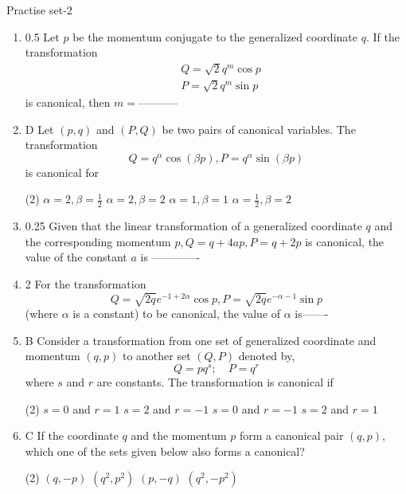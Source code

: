 \newpage
\begin{abox}
	Practise set-2
\end{abox}
\begin{enumerate}
	\item 0.5 Let $p$ be the momentum conjugate to the generalized coordinate $q$. If the transformation
	$$
	\begin{aligned}
	&Q=\sqrt{2} q^{m} \cos p \\
	&P=\sqrt{2} q^{m} \sin p
	\end{aligned}
	$$
	is canonical, then $m=$-----------
{}
	\item D Let $(p, q)$ and $(P, Q)$ be two pairs of canonical variables. The transformation
	$$
	Q=q^{\alpha} \cos (\beta p), P=q^{\alpha} \sin (\beta p)
	$$
	is canonical for
{}
	 \begin{tasks}(2)
		\task[\textbf{a.}]$\alpha=2, \beta=\frac{1}{2}$
		\task[\textbf{b.}]$\alpha=2, \beta=2$
		\task[\textbf{c.}]$\alpha=1, \beta=1$
		\task[\textbf{d.}] $\alpha=\frac{1}{2}, \beta=2$
	\end{tasks}
	\item 0.25 Given that the linear transformation of a generalized coordinate $q$ and the corresponding momentum $p, Q=q+4 a p, P=q+2 p$ is canonical, the value of the constant $a$ is -------------
	{}
\item 2 For the transformation
$$
Q=\sqrt{2 q} e^{-1+2 \alpha} \cos p, P=\sqrt{2 q} e^{-\alpha-1} \sin p
$$
(where $\alpha$ is a constant) to be canonical, the value of $\alpha$ is-------
{}
	\item B Consider a transformation from one set of generalized coordinate and momentum $(q, p)$ to another set $(Q, P)$ denoted by,
	$$
	Q=p q^{s} ; \quad P=q^{r}
	$$
	where $s$ and $r$ are constants. The transformation is canonical if
{}
	 \begin{tasks}(2)
		\task[\textbf{a.}]$s=0$ and $r=1$
		\task[\textbf{b.}]$s=2$ and $r=-1$
		\task[\textbf{c.}] $s=0$ and $r=-1$
		\task[\textbf{d.}] $s=2$ and $r=1$
	\end{tasks}
	\item C If the coordinate $q$ and the momentum $p$ form a canonical pair $(q, p)$, which one of the sets given below also forms a canonical?
{}
	 \begin{tasks}(2)
		\task[\textbf{a.}]$(q,-p)$
		\task[\textbf{b.}]$\left(q^{2}, p^{2}\right)$
		\task[\textbf{c.}]$(p,-q)$
		\task[\textbf{d.}] $\left(q^{2},-p^{2}\right)$

\end{tasks}
\end{enumerate}
